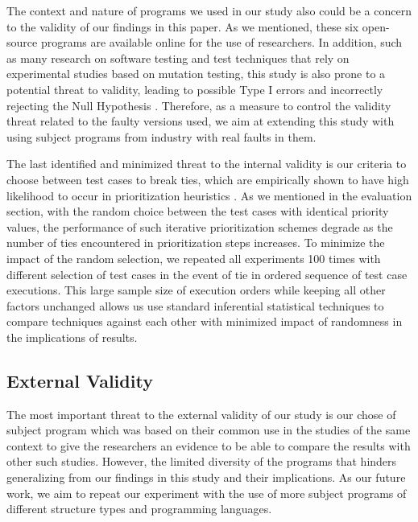 \documentclass{sig-alternate}
\begin{document}
The context and nature of programs we used in our study also could be a concern to the validity of our findings in this paper. As we mentioned, these six open-source programs are available online for the use of researchers. In addition, such as many research on software testing and test techniques that rely on experimental studies based on mutation testing, this study is also prone to a potential threat to validity, leading to possible Type I errors and incorrectly rejecting the Null Hypothesis \cite{papadakis:threats}. Therefore, as a measure to control the validity threat related to the faulty versions used, we aim at extending this study with using subject programs from industry with real faults in them.

The last identified and minimized threat to the internal validity is our criteria to choose between test cases to break ties, which are empirically shown to have high likelihood to occur in prioritization heuristics \cite{eghbali:lexico}. As we mentioned in the evaluation section, with the random choice between the test cases with identical priority values, the performance of such iterative prioritization schemes degrade as the number of ties encountered in prioritization steps increases. To minimize the impact of the random selection, we repeated all experiments 100 times with different selection of test cases in the event of tie in ordered sequence of test case executions. This large sample size of execution orders while keeping all other factors unchanged allows us use standard inferential statistical techniques to compare techniques against each other with minimized impact of randomness in the implications of results.   

\subsection{External Validity}
The most important threat to the external validity of our study is our chose of subject program which was based on their common use in the studies of the same context to give the researchers an evidence to be able to compare the results with other such studies. However, the limited diversity of the programs that hinders generalizing from our findings in this study and their implications. As our future work, we aim to repeat our experiment with the use of more subject programs of different structure types and programming languages.
\end{document}
